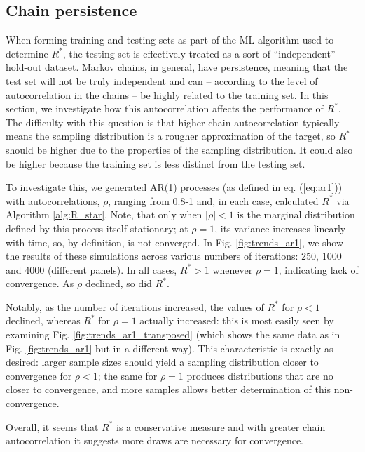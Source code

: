 \documentclass[ba]{imsart}
\numberwithin{equation}{section}
\theoremstyle{plain}
\begin{document}
\begin{supplement}
		\subsection{Chain persistence}\label{sec:non-stationary_persistence}
		When forming training and testing sets as part of the ML algorithm used to determine $R^*$, the testing set is effectively treated as a sort of ``independent'' hold-out dataset. Markov chains, in general, have persistence, meaning that the test set will not be truly independent and can -- according to the level of autocorrelation in the chains -- be highly related to the training set. In this section, we investigate how this autocorrelation affects the performance of $R^*$. The difficulty with this question is that higher chain autocorrelation typically means the sampling distribution is a rougher approximation of the target, so $R^*$ should be higher due to the properties of the sampling distribution. It could also be higher because the training set is less distinct from the testing set.
		
		To investigate this, we generated AR(1) processes (as defined in eq. (\ref{eq:ar1})) with autocorrelations, $\rho$, ranging from 0.8-1 and, in each case, calculated $R^*$ via Algorithm \ref{alg:R_star}. Note, that only when $|\rho|<1$ is the marginal distribution defined by this process itself stationary; at $\rho=1$, its variance increases linearly with time, so, by definition, is not converged. In Fig. \ref{fig:trends_ar1}, we show the results of these simulations across various numbers of iterations: 250, 1000 and 4000 (different panels). In all cases, $R^*>1$ whenever $\rho=1$, indicating lack of convergence. As $\rho$ declined, so did $R^*$.
		
		Notably, as the number of iterations increased, the values of $R^*$ for $\rho<1$ declined, whereas $R^*$ for $\rho=1$ actually increased: this is most easily seen by examining Fig. \ref{fig:trends_ar1_transposed} (which shows the same data as in Fig. \ref{fig:trends_ar1} but in a different way). This characteristic is exactly as desired: larger sample sizes should yield a sampling distribution closer to convergence for $\rho<1$; the same for $\rho=1$ produces distributions that are no closer to convergence, and more samples allows better determination of this non-convergence.
		
		Overall, it seems that $R^*$ is a conservative measure and with greater chain autocorrelation it suggests more draws are necessary for convergence.
		

\end{supplement}
\end{document}
